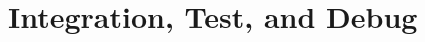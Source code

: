 \documentclass[ppfs.tex]{template/subfiles}
\begin{document}
\section{Integration, Test, and Debug}
\end{document}
